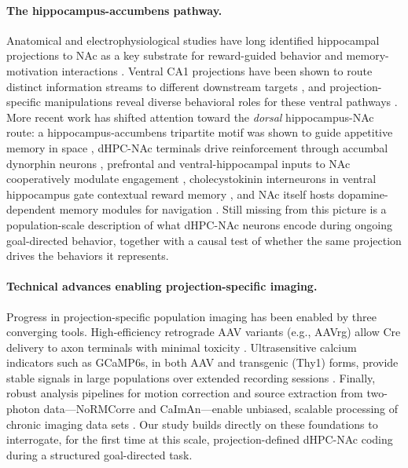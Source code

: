 \documentclass[11pt]{article}
\begin{document}
\paragraph{The hippocampus-accumbens pathway.}
Anatomical and electrophysiological studies have long identified hippocampal projections to NAc as a key substrate for reward-guided behavior and memory-motivation interactions \citep{Mogenson1980Motivation,Britt2012Synaptic}. Ventral CA1 projections have been shown to route distinct information streams to different downstream targets \citep{Ciocchi2015Selective}, and projection-specific manipulations reveal diverse behavioral roles for these ventral pathways \citep{Bakoyiannis2023Pathway}. More recent work has shifted attention toward the \emph{dorsal} hippocampus-NAc route: a hippocampus-accumbens tripartite motif was shown to guide appetitive memory in space \citep{Trouche2019Place}, dHPC-NAc terminals drive reinforcement through accumbal dynorphin neurons \citep{Ibrahim2024DorsalHPC}, prefrontal and ventral-hippocampal inputs to NAc cooperatively modulate engagement \citep{Iyer2025Engagement}, cholecystokinin interneurons in ventral hippocampus gate contextual reward memory \citep{Nguyen2024Cholecystokinin}, and NAc itself hosts dopamine-dependent memory modules for navigation \citep{Jung2024Dopamine}. Still missing from this picture is a population-scale description of what dHPC-NAc neurons encode during ongoing goal-directed behavior, together with a causal test of whether the same projection drives the behaviors it represents.

\paragraph{Technical advances enabling projection-specific imaging.}
Progress in projection-specific population imaging has been enabled by three converging tools. High-efficiency retrograde AAV variants (e.g., AAVrg) allow Cre delivery to axon terminals with minimal toxicity \citep{Tervo2016AAVretro}. Ultrasensitive calcium indicators such as GCaMP6s, in both AAV and transgenic (Thy1) forms, provide stable signals in large populations over extended recording sessions \citep{Chen2013GCaMP6,Dana2014Thy1GCaMP6}. Finally, robust analysis pipelines for motion correction and source extraction from two-photon data---NoRMCorre and CaImAn---enable unbiased, scalable processing of chronic imaging data sets \citep{Pnevmatikakis2017NoRMCorre,Giovannucci2019CaImAn}. Our study builds directly on these foundations to interrogate, for the first time at this scale, projection-defined dHPC-NAc coding during a structured goal-directed task.
\end{document}
